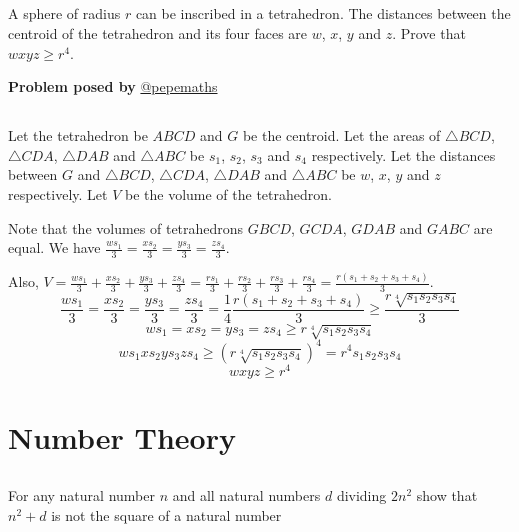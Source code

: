 \documentclass[12pt]{article}
\begin{document}
\subsection*{}
A sphere of radius $r$ can be inscribed in a tetrahedron. The distances between the centroid of the tetrahedron and its four faces are $w$, $x$, $y$ and $z$. Prove that $wxyz \ge r^4$.

\begin{flushright}
\textbf{Problem posed by}
\textcolor{RoyalBlue2}{\href{https://www.instagram.com/pepemaths/}{@pepemaths}}
\end{flushright}


\subsection*{}
Let the tetrahedron be $ABCD$ and $G$ be the centroid. Let the areas of $\triangle BCD$, $\triangle CDA$, $\triangle DAB$ and $\triangle ABC$ be $s_1$, $s_2$, $s_3$ and $s_4$ respectively. Let the distances between $G$ and $\triangle BCD$, $\triangle CDA$, $\triangle DAB$ and $\triangle ABC$ be $w$, $x$, $y$ and $z$ respectively. Let $V$ be the volume of the tetrahedron.

Note that the volumes of tetrahedrons $GBCD$, $GCDA$, $GDAB$ and $GABC$ are equal. We have $\frac{w s_1}{3}=\frac{x s_2}{3}=\frac{y s_3}{3}=\frac{z s_4}{3}$.

Also, $V=\frac{w s_1}{3}+\frac{x s_2}{3}+\frac{y s_3}{3}+\frac{z s_4}{3}=\frac{r s_1}{3}+\frac{r s_2}{3}+\frac{r s_3}{3}+\frac{r s_4}{3}=\frac{r(s_1 + s_2 + s_3 + s_4)}{3}$.
$$\frac{w s_1}{3}=\frac{x s_2}{3}=\frac{y s_3}{3}=\frac{z s_4}{3}=\frac{1}{4}\frac{r(s_1 + s_2 + s_3 + s_4)}{3} \ge \frac{r\sqrt[4]{s_1  s_2  s_3  s_4}}{3} $$
$$w s_1 = x s_2 = y s_3 = z s_4 \ge r \sqrt[4]{s_1  s_2  s_3  s_4}$$
$$w s_1  x s_2  y s_3  z s_4 \ge (r \sqrt[4]{s_1  s_2  s_3  s_4})^4=r^4 s_1  s_2  s_3  s_4$$
$$wxyz \ge r^4$$


\newpage

\section*{Number Theory}
\subsection*{}
For any natural number $n$ and all natural numbers $d$ dividing $2n^2$ show that $n^2+d$ is not the square of a natural number 
\end{document}
